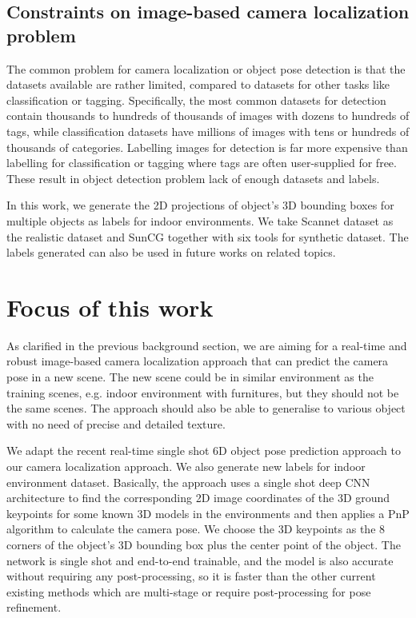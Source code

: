 \subsection{Constraints on image-based camera localization problem}

The common problem for camera localization or object pose detection is that the datasets available are rather limited, compared to datasets for other tasks like classification or tagging. Specifically, the most common datasets for detection contain thousands to hundreds of thousands of images with dozens to hundreds of tags, while classification datasets have millions of images with tens or hundreds of thousands of categories. Labelling images for detection is far more expensive than labelling for classification or tagging where tags are often user-supplied for free. These result in object detection problem lack of enough datasets and labels.

In this work, we generate the 2D projections of object's 3D bounding boxes for multiple objects as labels for indoor environments. We take Scannet dataset as the realistic dataset and SunCG together with six tools for synthetic dataset. The labels generated can also be used in future works on related topics.


\section{Focus of this work}

As clarified in the previous background section, we are aiming for a real-time and robust image-based camera localization approach that can predict the camera pose in a new scene. The new scene could be in similar environment as the training scenes, e.g. indoor environment with furnitures, but they should not be the same scenes. The approach should also be able to generalise to various object with no need of precise and detailed texture.

We adapt the recent real-time single shot 6D object pose prediction approach \cite{tekin2018real} to our camera localization approach. We also generate new labels for indoor environment dataset. Basically, the approach uses a single shot deep CNN architecture to find the corresponding 2D image coordinates of the 3D ground keypoints for some known 3D models in the environments and then applies a PnP algorithm to calculate the camera pose. We choose the 3D keypoints as the 8 corners of the object's 3D bounding box plus the center point of the object. The network is single shot and end-to-end trainable, and the model is also accurate without requiring any post-processing, so it is faster than the other current existing methods which are multi-stage or require post-processing for pose refinement.